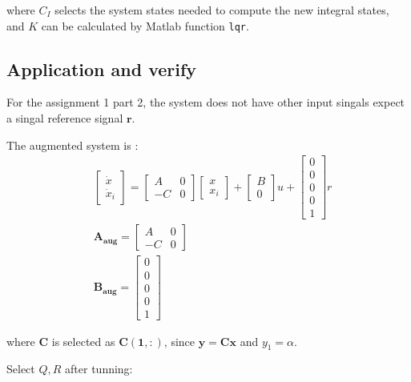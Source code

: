 where $C_I$ selects the system states needed to compute the new integral states, and $ K $ can be calculated by Matlab function \texttt{lqr}.

\subsection{Application and verify}

For the assignment 1 part 2, the system does not have other input singals expect a singal reference signal $ \mathbf{r} $.

The augmented system is :
\begin{equation}
    \begin{aligned}
        &\begin{bmatrix}\dot{x}\\\dot{x}_i\end{bmatrix}=\begin{bmatrix}A&0\\-C&0\end{bmatrix}\begin{bmatrix}x\\x_i\end{bmatrix}+\begin{bmatrix}B\\0\end{bmatrix}u+\begin{bmatrix}0\\0\\0\\0\\1\end{bmatrix}r\\
        &\mathbf{A_{aug}} = \begin{bmatrix}A&0\\-C&0\end{bmatrix} \\
        &\mathbf{B_{aug}} = \begin{bmatrix}0\\0\\0\\0\\1\end{bmatrix}
    \end{aligned}
\end{equation}

where $ \mathbf{C} $ is selected as $ \mathbf{C(1,:)} $, since $\mathbf{y = Cx }$ and $ y_1=\alpha $.

Select $Q,  R$ after tunning:

